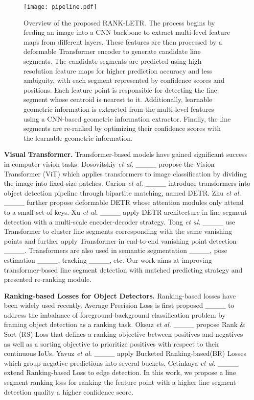 \begin{figure*}[t]
    \centering
    \texttt{[image: pipeline.pdf]}
    \caption{Overview of the proposed RANK-LETR. The process begins by feeding an image into a CNN backbone to extract multi-level feature maps from different layers. These features are then processed by a deformable Transformer encoder to generate candidate line segments. The candidate segments are predicted using high-resolution feature maps for higher prediction accuracy and less ambiguity, with each segment represented by confidence scores and positions. Each feature point is responsible for detecting the line segment whose centroid is nearest to it. Additionally, learnable geometric information is extracted from the multi-level features using a CNN-based geometric information extractor. Finally, the line segments are re-ranked by optimizing their confidence scores with the learnable geometric information.}
    \label{fig:pipeline}
\end{figure*}

\noindent\textbf{Visual Transformer.} 
Transformer-based models have gained significant success in computer vision tasks. Dosovitskiy \textit{et al.} ____ propose the Vision Transformer (ViT) which applies transformers to image classification by dividing the image into fixed-size patches. Carion \textit{et al.} ____ introduce transformers into object detection pipeline through bipartite matching, named DETR. Zhu \textit{et al.} ____ further propose deformable DETR whose attention modules only attend to a small set of keys. Xu \textit{et al.} ____ apply DETR architecture in line segment detection with a multi-scale encoder-decoder strategy. 
Tong \textit{et al.} ____ use Transformer to cluster line segments corresponding with the same vanishing points and further apply Transformer in end-to-end vanishing point detection ____. Transformers are also used in semantic segmentation ____, pose estimation ____, tracking ____, etc. Our work aims at improving transformer-based line segment detection with matched predicting strategy and presented re-ranking module.

\noindent\textbf{Ranking-based Losses for Object Detectors.} Ranking-based losses have been widely used recently. Average Precision Loss is first proposed ____ to address the imbalance of foreground-background classification problem by framing object detection as a ranking task. Oksuz \textit{et al.} ____ propose Rank \& Sort (RS) Loss that defines a ranking objective between positives and negatives as well as a sorting objective to prioritize positives with respect to their continuous IoUs.
Yavuz \textit{et al.} ____ apply Bucketed Ranking-based(BR) Losses which group negative predictions into several buckets.
Cetinkaya \textit{et al.} ____ extend Ranking-based Loss to edge detection. In this work, we propose a line segment ranking loss for ranking the feature point with a higher line segment detection quality a higher confidence score.